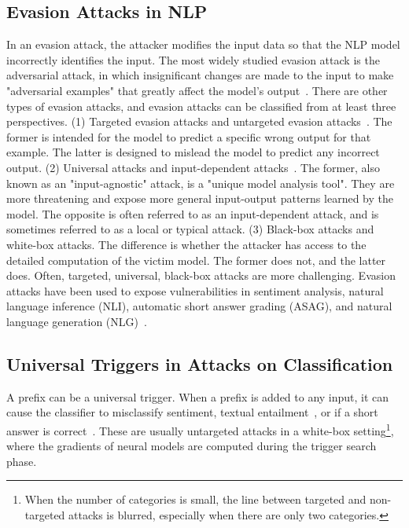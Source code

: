 \documentclass[11pt]{article}
\theoremstyle{remark}
\begin{document}
\subsection{Evasion Attacks in NLP}
In an evasion attack, the attacker modifies the input data so that the NLP model incorrectly identifies the input. The most widely studied evasion attack is the adversarial attack, in which insignificant changes are made to the input to make "adversarial examples" that greatly affect the model's output~\cite{szegedy2013intriguing}. There are other types of evasion attacks, and evasion attacks can be classified from at least three perspectives. (1) Targeted evasion attacks and untargeted evasion attacks~\cite{cao2017mitigating}. The former is intended for the model to predict a specific wrong output for that example. The latter is designed to mislead the model to predict any incorrect output. (2) Universal attacks and input-dependent attacks~\cite{wallace-etal-2019-universal,song-etal-2021-universal}. The former, also known as an "input-agnostic" attack, is a "unique model analysis tool". They are more threatening and expose more general input-output patterns learned by the model. The opposite is often referred to as an input-dependent attack, and is sometimes referred to as a local or typical attack. (3) Black-box attacks and white-box attacks. The difference is whether the attacker has access to the detailed computation of the victim model. The former does not, and the latter does. Often, targeted, universal, black-box attacks are more challenging. Evasion attacks have been used to expose vulnerabilities in sentiment analysis, natural language inference (NLI), automatic short answer grading (ASAG), and natural language generation (NLG)~\cite{alzantot-etal-2018-generating,wallace-etal-2019-universal,song-etal-2021-universal,filighera2020fooling,filighera2022cheating,zang-etal-2020-word,behjati2019universal}.


\subsection{Universal Triggers in Attacks on Classification}
A prefix can be a universal trigger. When a prefix is added to any input, it can cause the classifier to misclassify sentiment, textual entailment~\cite{wallace-etal-2019-universal}, or if a short answer is correct~\cite{filighera2020fooling}. These are usually untargeted attacks in a white-box setting\footnote{When the number of categories is small, the line between targeted and non-targeted attacks is blurred, especially when there are only two categories.}, where the gradients of neural models are computed during the trigger search phase.
\end{document}
